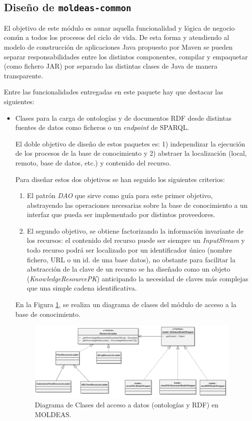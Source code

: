 \subsection{Diseño de \texttt{moldeas-common}}\label{sect:moldeas-common}
El objetivo de este módulo es aunar aquella funcionalidad y lógica 
de negocio común a todos los procesos del ciclo de vida. De esta forma y 
atendiendo al modelo de construcción de aplicaciones Java propuesto 
por Maven se pueden separar responsabilidades entre los distintos 
componentes, compilar y empaquetar (como fichero \gls{JAR}) por separado las distintas clases 
de Java de manera transparente.

Entre las funcionalidades entregadas en este paquete hay que destacar 
las siguientes:
\begin{itemize}
 \item Clases para la carga de ontologías y de documentos RDF desde distintas 
fuentes de datos como ficheros o un \textit{endpoint} de \gls{SPARQL}. 

El doble objetivo de diseño de estos paquetes es: 1) independizar la ejecución de los procesos de la base de conocimiento 
y 2) abstraer la localización  (local, remoto, base de datos, etc.) y contenido del recurso.

Para diseñar estos dos objetivos se han seguido los siguientes criterios:
\begin{enumerate}
  \item El patrón \textit{\gls{DAO}} que sirve como guía para este primer objetivo, abstrayendo
  las operaciones necesarias sobre la base de conocimiento a un interfaz que
  pueda ser implementado por distintos proveedores.
  \item El segundo objetivo, se obtiene factorizando la
  información invariante de los recursos: el contenido del recurso puede ser siempre un
  \textit{InputStream} y todo recurso podrá ser localizado por un identificador
  único (nombre fichero, \gls{URL} o un id. de una base datos), no obstante para
  facilitar la abstracción de la clave de un recurso se ha diseñado como un
  objeto (\textit{KnowledgeResourcePK}) anticipando la necesidad de claves más
  complejas que una simple cadena identificativa. 
\end{enumerate}

En la Figura \ref{fig:moldeas-loading}, se realiza un diagrama de clases del módulo de acceso
a la base de conocimiento.

\begin{figure}[!htb]
\centering
	\includegraphics[width=16cm]{images/phd/moldeas/moldeas-loading}
\caption{Diagrama de Clases del acceso a datos (ontologías y RDF) en MOLDEAS.}
\label{fig:moldeas-loading}
\end{figure}



\end{itemize}
